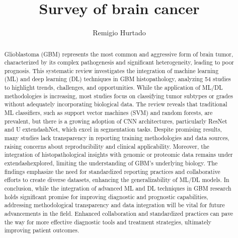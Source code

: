 \documentclass[runningheads]{llncs}
\begin{document}
%
\title{Survey of brain cancer}
%
%
\author{Remigio Hurtado}
%
%
%
\maketitle    
%
\begin{abstract}
Glioblastoma (GBM) represents the most common and aggressive form of brain tumor, characterized by its complex pathogenesis and significant heterogeneity, leading to poor prognosis. This systematic review investigates the integration of machine learning (ML) and deep learning (DL) techniques in GBM histopathology, analyzing 54 studies to highlight trends, challenges, and opportunities. While the application of ML/DL methodologies is increasing, most studies focus on classifying tumor subtypes or grades without adequately incorporating biological data. The review reveals that traditional ML classifiers, such as support vector machines (SVM) and random forests, are prevalent, but there is a growing adoption of CNN architectures, particularly ResNet and U	extendash{}Net, which excel in segmentation tasks. Despite promising results, many studies lack transparency in reporting training methodologies and data sources, raising concerns about reproducibility and clinical applicability. Moreover, the integration of histopathological insights with genomic or proteomic data remains under	extendash{}explored, limiting the understanding of GBM's underlying biology. The findings emphasize the need for standardized reporting practices and collaborative efforts to create diverse datasets, enhancing the generalizability of ML/DL models. In conclusion, while the integration of advanced ML and DL techniques in GBM research holds significant promise for improving diagnostic and prognostic capabilities, addressing methodological transparency and data integration will be vital for future advancements in the field. Enhanced collaboration and standardized practices can pave the way for more effective diagnostic tools and treatment strategies, ultimately improving patient outcomes.
\end{abstract}
\end{document}
